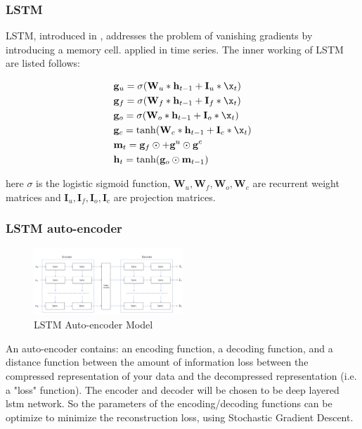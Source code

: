 \documentclass[5p]{elsarticle}
\begin{document}
\subsubsection{LSTM}
LSTM, introduced in \cite{Hochreiter1997LongMemory}, addresses the problem of vanishing gradients by introducing a memory cell. \cite{MalhotraLongSeries} applied in time series. The inner working of LSTM are listed follows:

\begin{equation}
	\begin{split}
		& \mathbf g_u = \sigma(\mathbf W_u * \mathbf h_{t-1} + \mathbf I_u * \x_t) \\
		& \mathbf g_f = \sigma(\mathbf W_f * \mathbf h_{t-1} + \mathbf I_f * \x_t) \\
		& \mathbf g_o = \sigma(\mathbf W_o * \mathbf h_{t-1} + \mathbf I_o * \x_t) \\
		& \mathbf g_c = \tanh(\mathbf W_c * \mathbf h_{t-1} + \mathbf I_c * \x_t) \\
		& \mathbf m_t = \mathbf g_f \odot \mathbf +  \mathbf g^u \odot \mathbf g^c \\
		& \mathbf h_t = \tanh(\mathbf g_o \odot \mathbf m_{t-1}) 
	\end{split}
\end{equation}

here $\sigma$ is the logistic sigmoid function, $\mathbf W_u, \mathbf W_f, \mathbf W_o, \mathbf W_c$ are recurrent weight matrices and $\mathbf I_u, \mathbf I_f, \mathbf I_o, \mathbf I_c$ are projection matrices.


\subsubsection{LSTM auto-encoder}
\begin{figure}[h]
    \centering
    \includegraphics[width=0.5\textwidth]{auto_encoder.png}
    \caption{LSTM Auto-encoder Model}
    \label{fig:RNN_encoder-decoder}
\end{figure}

An auto-encoder contains: an encoding function, a decoding function, and a distance function between the amount of information loss between the compressed representation of your data and the decompressed representation (i.e. a "loss" function). The encoder and decoder will be chosen to be deep layered lstm network. So the parameters of the encoding/decoding functions can be optimize to minimize the reconstruction loss, using Stochastic Gradient Descent.
\end{document}
